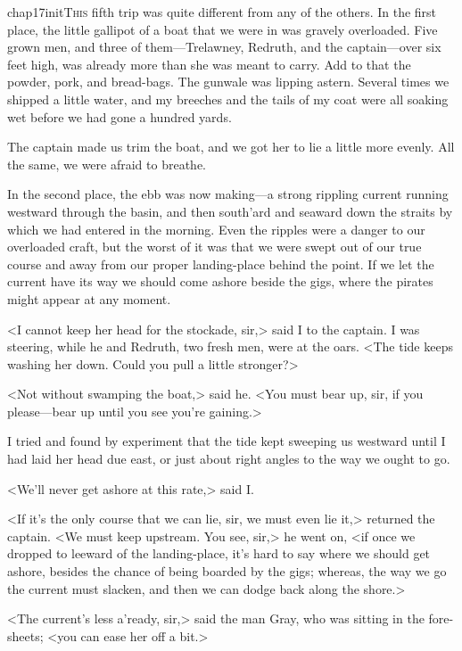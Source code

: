 
\lettrine{chap17initT}{his} fifth trip was quite different from any of the others. In the first place, the little gallipot of a boat that we were in was gravely overloaded. Five grown men, and three of them—Trelawney, Redruth, and the captain—over six feet high, was already more than she was meant to carry. Add to that the powder, pork, and bread-bags. The gunwale was lipping astern. Several times we shipped a little water, and my breeches and the tails of my coat were all soaking wet before we had gone a hundred yards.

The captain made us trim the boat, and we got her to lie a little more evenly. All the same, we were afraid to breathe.

In the second place, the ebb was now making—a strong rippling current running westward through the basin, and then south'ard and seaward down the straits by which we had entered in the morning. Even the ripples were a danger to our overloaded craft, but the worst of it was that we were swept out of our true course and away from our proper landing-place behind the point. If we let the current have its way we should come ashore beside the gigs, where the pirates might appear at any moment.

<I cannot keep her head for the stockade, sir,> said I to the captain. I was steering, while he and Redruth, two fresh men, were at the oars. <The tide keeps washing her down. Could you pull a little stronger?>

<Not without swamping the boat,> said he. <You must bear up, sir, if you please—bear up until you see you're gaining.>

I tried and found by experiment that the tide kept sweeping us westward until I had laid her head due east, or just about right angles to the way we ought to go.

<We'll never get ashore at this rate,> said I\@.

<If it's the only course that we can lie, sir, we must even lie it,> returned the captain. <We must keep upstream. You see, sir,> he went on, <if once we dropped to leeward of the landing-place, it's hard to say where we should get ashore, besides the chance of being boarded by the gigs; whereas, the way we go the current must slacken, and then we can dodge back along the shore.>

<The current's less a'ready, sir,> said the man Gray, who was sitting in the fore-sheets; <you can ease her off a bit.>

